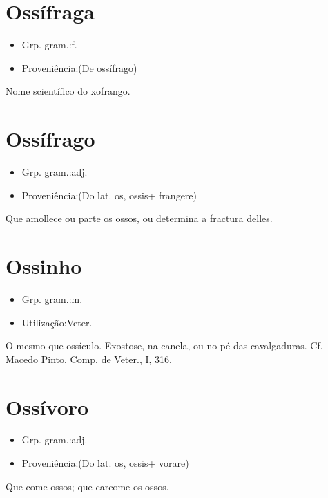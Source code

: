\section{Ossífraga}
\begin{itemize}
\item {Grp. gram.:f.}
\end{itemize}
\begin{itemize}
\item {Proveniência:(De \textunderscore ossífrago\textunderscore )}
\end{itemize}
Nome scientífico do xofrango.
\section{Ossífrago}
\begin{itemize}
\item {Grp. gram.:adj.}
\end{itemize}
\begin{itemize}
\item {Proveniência:(Do lat. \textunderscore os\textunderscore , \textunderscore ossis\textunderscore  + \textunderscore frangere\textunderscore )}
\end{itemize}
Que amollece ou parte os ossos, ou determina a fractura delles.
\section{Ossinho}
\begin{itemize}
\item {Grp. gram.:m.}
\end{itemize}
\begin{itemize}
\item {Utilização:Veter.}
\end{itemize}
O mesmo que \textunderscore ossículo\textunderscore .
Exostose, na canela, ou no pé das cavalgaduras. Cf. Macedo Pinto, \textunderscore Comp. de Veter.\textunderscore , I, 316.
\section{Ossívoro}
\begin{itemize}
\item {Grp. gram.:adj.}
\end{itemize}
\begin{itemize}
\item {Proveniência:(Do lat. \textunderscore os\textunderscore , \textunderscore ossis\textunderscore  + \textunderscore vorare\textunderscore )}
\end{itemize}
Que come ossos; que carcome os ossos.
